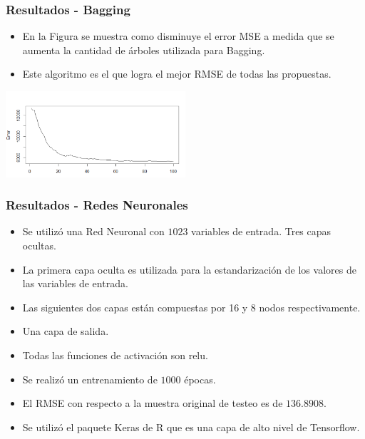 \documentclass{beamer}
\begin{document}
\begin{frame}[t]
\frametitle{Resultados - Bagging}
\vfill
\begin{itemize}
\item
En la Figura se muestra como disminuye el error MSE a medida que se aumenta la cantidad de árboles utilizada para Bagging.
\item
Este algoritmo es el que logra el mejor RMSE de todas las propuestas.
\end{itemize}
\centering
\includegraphics[width=0.5\textwidth]{errorMSEBagging}
\vfill
\end{frame}
\begin{frame}[t]
\frametitle{Resultados - Redes Neuronales}
\vfill
\begin{itemize}
\item
Se utilizó una Red Neuronal con $1023$ variables de entrada.
Tres capas ocultas.
\item
La primera capa oculta es utilizada para la estandarización de los valores de las variables de entrada.
\item
Las siguientes dos capas están compuestas por 16 y 8 nodos respectivamente.
\item
Una capa de salida.
\item
Todas las funciones de activación son relu.
\item
Se realizó un entrenamiento de $1000$ épocas.
\item
El RMSE con respecto a la muestra original de testeo es de $136.8908$. 
\item
Se utilizó el paquete Keras de R que es una capa de alto nivel de Tensorflow.
\end{itemize}
\vfill
\end{frame}
\end{document}

